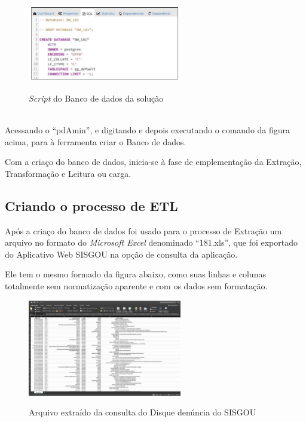 \begin{figure}[H]
	\vspace*{0,2cm}
    \centering
    \caption{\textit{Script} do Banco de dados da solu\c{c}\~{a}o}
    \includegraphics[width=0.6\textwidth]{./04-figuras/figura-16}
    \label{fig:ilustfig16}
\end{figure}
\vspace*{-0,9cm}
{\raggedright {}} \\

Acessando o ``pdAmin'', e digitando e depois executando o comando da figura acima, para à ferramenta criar o Banco de dados.

Com a cria\c{c}o do banco de dados, inicia-se à fase de emplementa\c{c}\~{a}o da Extra\c{c}\~{a}o, Transforma\c{c}\~{a}o e Leitura ou carga.

\subsection{Criando o processo de ETL}

Ap\'{o}s a cria\c{c}o do banco de dados foi usado para o processo de Extra\c{c}\~{a}o um arquivo no 
formato do \textit{Microsoft Excel} denominado ``181.xls'', que foi exportado  do Aplicativo Web SISGOU na  op\c{c}\~{a}o de consulta da aplica\c{c}\~{a}o. 

Ele tem o mesmo formado da figura abaixo, como suas 
linhas e colunas totalmente sem normatiza\c{c}\~{a}o aparente e com os dados sem formata\c{c}\~{a}o.

\begin{figure}[H]
	\vspace*{0,2cm}
    \centering
    \caption{Arquivo extra\'{i}do da consulta do Disque denúncia do  SISGOU}
    \includegraphics[width=0.6\textwidth]{./04-figuras/arquivo-excel-181.png}
    \label{fig:ilustfigfaltafigura01}
\end{figure}
\vspace*{-0,9cm}
{\raggedright {}} \\

